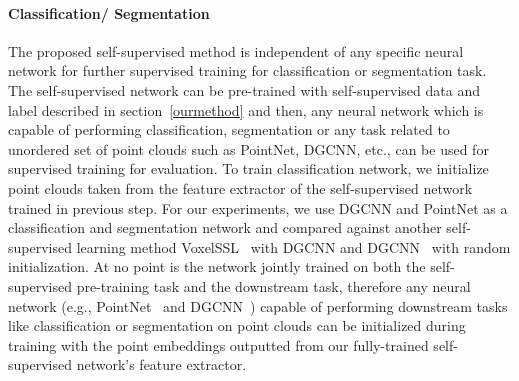 \documentclass{article}
\begin{document}
\paragraph{Classification/ Segmentation}
The proposed self-supervised method is independent of any specific neural network for further supervised training for classification or segmentation task. The self-supervised network can be pre-trained with self-supervised data and label described in section~\ref{ourmethod} and then, any neural network which is capable of performing classification, segmentation or any task related to unordered set of point clouds such as PointNet, DGCNN, etc., can be used for supervised training for evaluation. To train classification network, we initialize point clouds taken from the feature extractor of the self-supervised network trained in previous step. For our experiments, we use DGCNN and PointNet as a classification and segmentation network and compared against another self-supervised learning method VoxelSSL~\cite{sauder2019self} with DGCNN and DGCNN~\cite{dgcnn} with random initialization.
\fi
At no point is the network jointly trained on both the self-supervised pre-training task and the downstream task, 
therefore any neural network (e.g., PointNet~\cite{qi2017pointnet} and DGCNN~\cite{dgcnn}) capable of performing downstream tasks like classification or segmentation on point clouds can be initialized during training with the point embeddings outputted from our fully-trained self-supervised network's feature extractor. 
\end{document}
